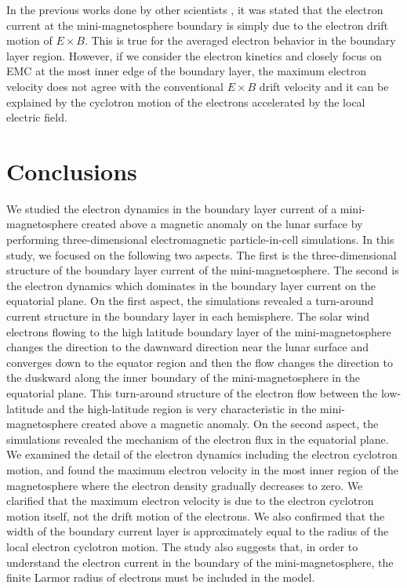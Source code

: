 \documentclass[draft,jgrga]{agutex2015}
\begin{document}
\begin{article}
In the previous works done by other scientists \citep[e.g.][]{Deca2014},
it was stated that
the electron current at the mini-magnetosphere boundary is 
simply due to the electron drift motion of $E\times B$. 
This is true for the averaged electron behavior in the boundary layer region.
However, if we consider the electron kinetics and closely focus on EMC
at the most inner edge of the boundary layer,
the maximum electron velocity does not agree with 
the conventional $E \times B$ drift velocity and it can be explained by the
cyclotron motion of the electrons accelerated by the local electric field. 

%
%
%
%

\section{Conclusions}
We studied the electron dynamics in the boundary layer current of 
a mini-magnetosphere created above a magnetic anomaly on the lunar surface 
by performing three-dimensional electromagnetic particle-in-cell simulations.
In this study, we focused on the following two aspects.
The first is the three-dimensional structure of 
the boundary layer current of the mini-magnetosphere. 
The second is the electron dynamics which dominates 
in the boundary layer current on the equatorial plane.
On the first aspect,
the simulations revealed  a turn-around current structure in the boundary layer in each hemisphere.
The solar wind electrons flowing 
to the high latitude boundary layer of the mini-magnetosphere
changes the direction to the dawnward direction 
near the lunar surface and converges down to the equator region 
and then the flow changes the direction to the duskward
along the inner boundary of the mini-magnetosphere in the equatorial plane.
This turn-around structure of the electron flow 
between the low-latitude and the high-latitude region is 
very characteristic in the mini-magnetosphere created above a magnetic anomaly.
On the second aspect,
the simulations revealed the mechanism of the electron flux in the equatorial plane. 
We examined the detail of the electron dynamics including the electron cyclotron motion,
and found the maximum electron velocity in the most inner region of 
the magnetosphere where the electron density gradually decreases to zero.
We clarified that the maximum electron velocity
is due to the electron cyclotron motion itself, 
not the drift motion of the electrons.
We also confirmed that the width of the boundary current layer 
is approximately equal to the radius of the local electron cyclotron motion.
The study also suggests that, in order to understand the electron current in the boundary of the mini-magnetosphere, 
 the finite Larmor radius of electrons must be included in the model.


\end{article}
\end{document}
